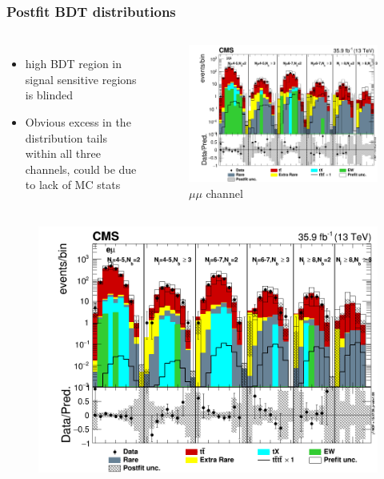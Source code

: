 \documentclass{beamer}
\begin{document}
\begin{frame}
\frametitle{Postfit BDT distributions}
\vspace{-10pt}
\begin{columns}
	\begin{itemize} \vspace{-10pt}
		\item high BDT region in signal sensitive regions is blinded
		\vspace{5pt}
		\item Obvious excess in the distribution tails within all three channels, could be due to lack of MC stats
	\end{itemize}
	\begin{figure} \vspace{-30pt}
		\includegraphics[width=0.8\linewidth]{hist_mumu_log.png}
		\caption{$\mu \mu$ channel}
	\end{figure}
\end{columns}
\begin{columns}
	\begin{figure} \vspace{-10pt}
		\includegraphics[width=0.8\linewidth]{hist_muel_log.png}

\end{figure}
\end{columns}
\end{frame}
\end{document}
